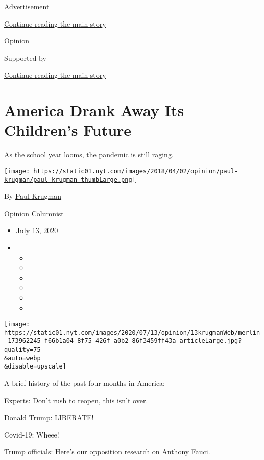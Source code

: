 Advertisement

\protect\hyperlink{after-top}{Continue reading the main story}

\href{/section/opinion}{Opinion}

Supported by

\protect\hyperlink{after-sponsor}{Continue reading the main story}

\hypertarget{america-drank-away-its-childrens-future}{%
\section{America Drank Away Its Children's
Future}\label{america-drank-away-its-childrens-future}}

As the school year looms, the pandemic is still raging.

\href{https://www.nytimes.com/by/paul-krugman}{\texttt{[image: https://static01.nyt.com/images/2018/04/02/opinion/paul-krugman/paul-krugman-thumbLarge.png]}}

By \href{https://www.nytimes.com/by/paul-krugman}{Paul Krugman}

Opinion Columnist

\begin{itemize}
\item
  July 13, 2020
\item
  \begin{itemize}
  \item
  \item
  \item
  \item
  \item
  \item
  \end{itemize}
\end{itemize}

\texttt{[image: https://static01.nyt.com/images/2020/07/13/opinion/13krugmanWeb/merlin\_173962245\_f66b1a04-8f75-426f-a0b2-86f3459ff43a-articleLarge.jpg?quality=75\\\&auto=webp\\\&disable=upscale]}

A brief history of the past four months in America:

Experts: Don't rush to reopen, this isn't over.

Donald Trump: LIBERATE!

Covid-19: Wheee!

Trump officials: Here's our
\href{https://www.nytimes.com/2020/07/12/us/politics/fauci-trump-coronavirus.html}{opposition
research} on Anthony Fauci.


